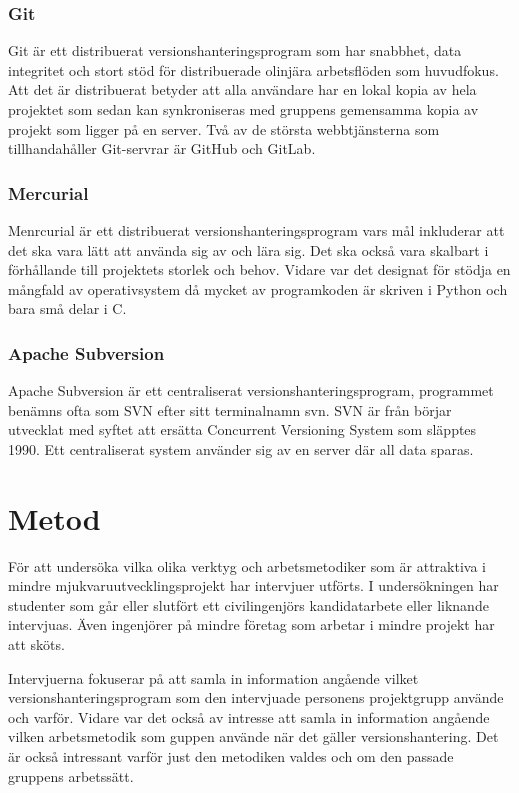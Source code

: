 \subsubsection{Git}
Git är ett distribuerat versionshanteringsprogram som har snabbhet, data integritet och stort stöd för distribuerade olinjära arbetsflöden som huvudfokus. Att det är distribuerat betyder att alla användare har en lokal kopia av hela projektet som sedan kan synkroniseras med gruppens gemensamma kopia av projekt som ligger på en server. Två av de största webbtjänsterna som tillhandahåller Git-servrar är GitHub och GitLab.\cite{VersionControlGit}\cite{web_Git}

\subsubsection{Mercurial}
Menrcurial är ett distribuerat versionshanteringsprogram vars mål inkluderar att det ska vara lätt att använda sig av och lära sig. Det ska också vara skalbart i förhållande till projektets storlek och behov. Vidare var det designat för stödja en mångfald av operativsystem då mycket av programkoden är skriven i Python och bara små delar i C.
\cite{VersionControlMercurial}\cite{VersionControlMercurial}


\subsubsection{Apache Subversion}
Apache Subversion är ett centraliserat versionshanteringsprogram, programmet benämns ofta som SVN efter sitt terminalnamn svn. SVN är från börjar utvecklat med syftet att ersätta Concurrent Versioning System som släpptes 1990. Ett centraliserat system använder sig av en server där all data sparas.\cite{wiki_cvs}\cite{VersionControlSvn}\cite{web_Svn}
\clearpage


\section{Metod}
För att undersöka vilka olika verktyg och arbetsmetodiker som är attraktiva i mindre mjukvaruutvecklingsprojekt har intervjuer utförts. I undersökningen har studenter som går eller slutfört ett civilingenjörs kandidatarbete eller liknande intervjuas. Även ingenjörer på mindre företag som arbetar i mindre projekt har att sköts.

Intervjuerna fokuserar på att samla in information angående vilket versionshanteringsprogram som den intervjuade personens projektgrupp använde och varför. Vidare var det också av intresse att samla in information angående vilken arbetsmetodik som guppen använde när det gäller versionshantering. Det är också intressant varför just den metodiken valdes och om den passade gruppens arbetssätt.

